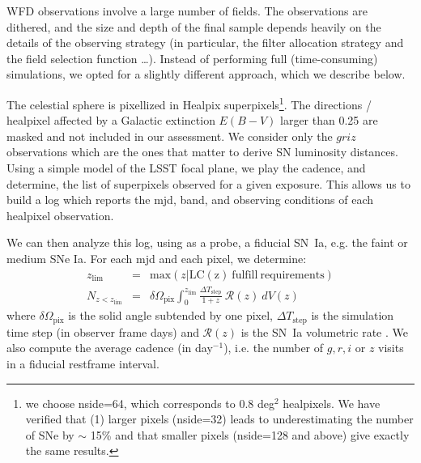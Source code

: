 \documentclass[a4paper,10pt]{article}
\newcommand{\sne}{{SNe Ia}}
\begin{document}
WFD observations involve a large number of fields.  The observations
are dithered, and the size and depth of the final sample depends
heavily on the details of the observing strategy (in particular, the
filter allocation strategy and the field selection function \ldots). Instead of performing full (time-consuming) simulations, we opted for a slightly different approach, which we describe below.

The celestial sphere is pixellized in Healpix superpixels\footnote{we
  choose nside=64, which corresponds to 0.8 deg$^2$ healpixels.  We
  have verified that (1) larger pixels (nside=32) leads to
  underestimating the number of SNe by $\sim$ 15\% and
  that smaller pixels (nside=128 and above) give exactly the same
  results.}.  The directions / healpixel affected by a Galactic extinction $E(B-V)$ larger than 0.25
are masked and not included in our assessment. We consider only the $griz$ observations which are the ones
that matter to derive SN luminosity distances. 
Using a simple model of the LSST focal plane, we play
the cadence, and determine, the list of superpixels observed for a
given exposure. This allows us to build a log which reports the mjd,
band, and observing conditions of each healpixel observation.

We can then analyze this log, using as a probe, a fiducial SN~Ia,
e.g. the faint or medium \sne. For each mjd and each pixel, we determine:
\begin{eqnarray}
  z_{\mathrm{lim}} & = & \mathrm{max}\left(z | \mathrm{LC(z)\ fulfill\ requirements}\right) \\
  N_{z<z_{\mathrm{lim}}} &= & \delta\Omega_{\mathrm{pix}} \int_0^{z_\mathrm{lim}} \frac{\Delta T_{\mathrm{step}}}{1+z}\ {\mathcal{R}}(z)\ dV(z)
\end{eqnarray}
where $\delta\Omega_{\mathrm{pix}}$ is the solid angle subtended by
one pixel, $\Delta T_{\mathrm{step}}$ is the simulation time step (in
observer frame days) and $\mathcal{R}(z)$ is the SN~Ia volumetric rate \cite{perrett}.  We also
compute the average cadence (in day$^{-1}$), i.e. the number of $g, r,
i$ or $z$ visits in a fiducial restframe interval.
\end{document}
